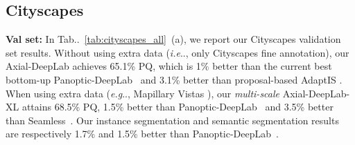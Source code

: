 \documentclass[runningheads]{llncs}
\makeatletter
\DeclareRobustCommand\onedot{\futurelet\@let@token\@onedot}
\def\@onedot{\ifx\@let@token.\else.\null\fi\xspace}
\def\eg{\emph{e.g}\onedot} \def\Eg{\emph{E.g}\onedot}
\def\ie{\emph{i.e}\onedot} \def\Ie{\emph{I.e}\onedot}
\newcommand{\tabref}[1]{Tab\onedot~\ref{#1}}
\makeatother
\begin{document}
\subsection{Cityscapes}
\label{sec:cityscapes}

{\bf Val set:} In \tabref{tab:cityscapes_all}~(a), we report our Cityscapes validation set results. Without using extra data (\ie, only Cityscapes fine annotation), our Axial-DeepLab achieves 65.1\% PQ, which is 1\% better than the current best bottom-up Panoptic-DeepLab~\cite{cheng2019panoptic} and 3.1\% better than proposal-based AdaptIS \cite{sofiiuk2019adaptis}. When using extra data (\eg, Mapillary Vistas \cite{neuhold2017mapillary}), our {\it multi-scale} Axial-DeepLab-XL attains 68.5\% PQ, 1.5\% better than Panoptic-DeepLab~\cite{cheng2019panoptic} and 3.5\% better than Seamless~\cite{porzi2019seamless}. Our instance segmentation and semantic segmentation results are respectively 1.7\% and 1.5\% better than Panoptic-DeepLab~\cite{cheng2019panoptic}.
\end{document}
